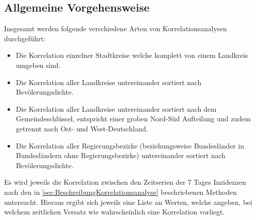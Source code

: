\subsection{Allgemeine Vorgehensweise}
Insgesamt werden folgende verschiedene Arten von Korrelationsanalysen durchgeführt:
\begin{itemize}
    \item Die Korrelation einzelner Stadtkreise welche komplett von einem Landkreis umgeben sind.
    \item Die Korrelation aller Landkreise untereinander sortiert nach Bevölerungsdichte.
    \item Die Korrelation aller Landkreise untereinander sortiert nach dem Gemeindeschlüssel, entspricht einer groben Nord-Süd Aufteilung und zudem getrennt nach Ost- und West-Deutschland.
    \item Die Korrelation aller Regierungsbezirke (beziehungsweise Bundesländer in Bundesländern ohne Regierungsbezirke) untereinander sortiert nach Bevölerungsdichte.
\end{itemize}
Es wird jeweils die Korrelation zwischen den Zeitserien der 7 Tages Inzidenzen nach den in \autoref{sec:BeschreibungKorrelationsanalyse} beschriebenen Methoden untersucht. Hieraus ergibt sich jeweils eine Liste an Werten, welche angeben, bei welchem zeitlichen Versatz wie wahrscheinlich eine Korrelation vorliegt.

